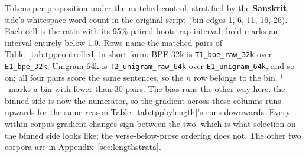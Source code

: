 \begin{table}[t]
\caption{Tokens per proposition under the matched control, stratified by the \textbf{Sanskrit} side's whitespace word count in the original script (bin edges 1, 6, 11, 16, 26). Each cell is the ratio with its 95\% paired bootstrap interval; bold marks an interval entirely below 1.0. Rows name the matched pairs of Table~\ref{tab:tppcontrolled} in short form: BPE 32k is \texttt{T1\_bpe\_raw\_32k} over \texttt{E1\_bpe\_32k}, Unigram 64k is \texttt{T2\_unigram\_raw\_64k} over \texttt{E1\_unigram\_64k}, and so on; all four pairs score the same sentences, so the $n$ row belongs to the bin. $^{\dagger}$~marks a bin with fewer than 30 pairs. The bias runs the other way here: the binned side is now the numerator, so the gradient across these columns runs upwards for the same reason Table~\ref{tab:tppbylength}'s runs downwards. Every within-corpus gradient changes sign between the two, which is what selection on the binned side looks like; the verse-below-prose ordering does not. The other two corpora are in Appendix~\ref{sec:lengthstrata}.}
\label{tab:tppbylengthsa}
\end{table}
